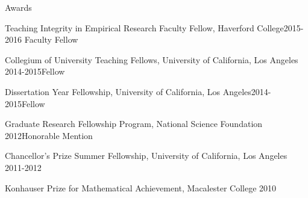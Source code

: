 \documentclass{resume} %
\begin{document}
\begin{rSection}{Awards}
\begin{esSubsection}{Teaching Integrity in Empirical Research Faculty Fellow,}{ Haverford College}{2015-2016}
{Faculty Fellow}{}
\end{esSubsection}
\begin{esSubsection}{Collegium of University Teaching Fellows,}{ University of California, Los Angeles }{2014-2015}{Fellow}{}
\end{esSubsection}
\begin{esSubsection}{Dissertation Year Fellowship,}{ University of California, Los Angeles}{2014-2015}{Fellow}{}
\end{esSubsection}
\begin{esSubsection}{Graduate Research Fellowship Program,}{ National Science Foundation }{2012}{Honorable Mention}{}
\end{esSubsection}
\begin{esSubsection}{Chancellor's Prize Summer Fellowship,}{ University of California, Los Angeles }{2011-2012}{}{}
\end{esSubsection}
\begin{esSubsection}{Konhauser Prize for Mathematical Achievement,}{ Macalester College}{ 2010}{}{}
\end{esSubsection}
\end{rSection}



\end{document}
